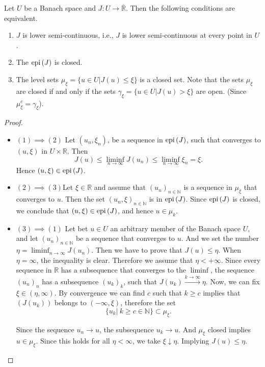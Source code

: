\begin{theorem}
	\label{th4: levelsets and lsc}
	Let $U$ be a Banach space and $J: U\rightarrow \overline{\mathbb{R}}$. Then the following conditions are equivalent.
	\begin{enumerate}
		\item $J$ is lower semi-continuous, i.e., $J$ is lower semi-continuous at every point in $U$.
		\item The $\mathrm{epi\,}(J)$ is closed.
		\item The level sets $\mu_\xi=\lbrace u \in U | J(u)\leq \xi \rbrace$ is a closed set. Note that  the sets $\mu_\xi$ are closed if and only if the sets $\gamma_\xi=\lbrace u \in U | J(u)> \xi \rbrace $ are open. (Since $\mu_\xi ^c = \gamma _\xi$).

	\end{enumerate}
	\begin{proof}\
		
		\begin{itemize}
			\item $(1)\implies(2)$ Let $(u_n, \xi_n)$, be a sequence in $\mathrm{epi\,}(J)$, such that converges to $(u,\xi)$ in $U\times\mathbb{R}$. Then \[J(u)\leq \liminf_{n\rightarrow \infty} J(u_n) \leq \liminf_{n\rightarrow \infty}\xi_n=\xi. \]Hence $(u, \xi) \in \mathrm{epi\,} (J)$.
			
			\item $(2)\implies (3)$Let $\xi\in \mathbb{R}$ and assume that $(u_n)_{n\in \mathbb{N}}$ is a sequence in $\mu_\xi$ that converges to $u$. 
			Then the set $(u_n,\xi)_{n\in\mathbb{N}}$ is in $\mathrm{epi\,} (J)$. Since $\mathrm{epi\,} (J)$ is closed, we conclude that $(u, \xi)\in \mathrm{epi\,} (J)$, and hence $u \in \mu_k$.
			
			\item $(3)\implies (1)$ Let bet $u \in U$ an arbitrary member of the Banach space $U$, and let $(u_n)_{n\in \mathbb{N}}$ be a sequence that converges to $u$. And we set the number $\eta=\liminf_{n\rightarrow \infty} J(u_n)$. Then we have to prove that $J(u)\leq \eta$. When $\eta=\infty$, the inequality is clear. Therefore we assume that $\eta < +\infty$. Since every sequence in $\mathbb{R}$ has a subsequence that converges to the $\liminf$, the sequence $(u_n)_n$ has a subsequence $(u_k)_k$, such that $J(u_k) \xrightarrow{k\rightarrow\infty} \eta$. Now, we can fix $\xi \in (\eta, \infty)$. By convergence we can find $c$ such that $k\geq c$ implies that $(J(u_k))$ belongs to $(-\infty, \xi)$, therefore the set \[\lbrace u_k | \ k \geq c \in \mathbb{N}\rbrace \subset \mu_\xi. \]
			
			Since the sequence $u_n \rightarrow u$, the subsequence $u_k\rightarrow u$. And $\mu_\xi$ closed implies $u \in \mu_\xi$. Since this holds for all $\eta < \infty$, we take $\xi \downarrow \eta$. Implying $J(u)\leq \eta$. 
		\end{itemize}
	\end{proof}
\end{theorem}
